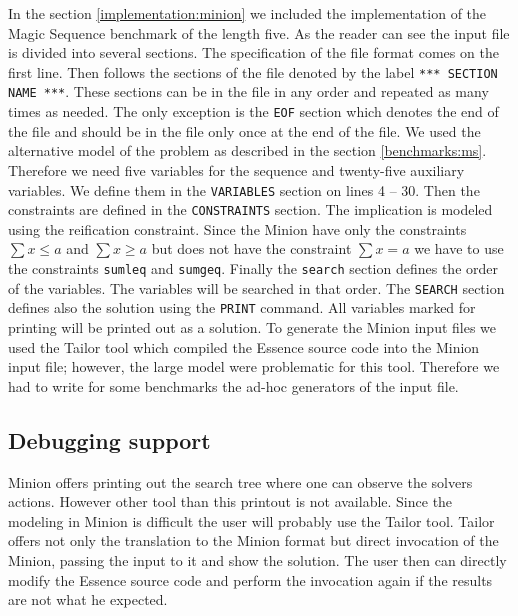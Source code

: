 In the section \ref{implementation:minion} we included the implementation of the Magic
Sequence benchmark of the length five. As the reader can see the input file
is divided into several sections. The specification of the file format comes on the first line.
Then follows the sections of the file denoted by the label \texttt{*** SECTION NAME ***}. These
sections can be in the file in any order and repeated as many times as needed. The
only exception is the \texttt{EOF} section which denotes the end of the file and should be in
the file only once at the end of the file. We used the alternative model of the 
problem as described in the section \ref{benchmarks:ms}. Therefore we need five 
variables for the sequence and twenty-five auxiliary variables. We define them in 
the \texttt{VARIABLES} section on lines 4 -- 30. Then the constraints are defined in the 
\texttt{CONSTRAINTS} section. The implication is modeled using the reification constraint.
Since the Minion have only the constraints $\sum{x} \leq a$ and $\sum{x} \geq a$ but
 does not have the constraint $\sum{x} = a$ we have to use the constraints \texttt{sumleq} and
 \texttt{sumgeq}. Finally the \texttt{search} section defines the order of the variables.
 The variables will be searched in that order. The \texttt{SEARCH} section defines also the
 solution using the \texttt{PRINT} command. All variables marked for printing will
 be printed out as a solution. To generate the Minion input files we used the Tailor tool which
 compiled the Essence source code into the Minion input file; however, the large
 model were problematic for this tool. Therefore we had to write for some benchmarks
 the ad-hoc generators of the input file.
 
\subsection{Debugging support}
Minion offers printing out the search tree where one can observe the solvers actions.
However other tool than this printout is not available. Since the modeling in Minion
is difficult the user will probably use the Tailor tool. Tailor offers not only the translation
to the Minion format but direct invocation of the Minion, passing the input to it and
show the solution. The user then can directly modify the Essence source code and perform
the invocation again if the results are not what he expected. 


